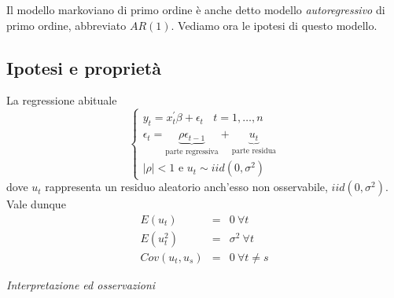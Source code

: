 \documentclass[a4paper]{report}
\newcounter{ese}
\theoremstyle{remark}
\begin{document}
Il modello markoviano di primo ordine \`{e} anche detto modello \emph{%
autoregressivo} di primo ordine, abbreviato $AR(1)$. Vediamo ora le ipotesi
di questo modello.

\subsection{Ipotesi e propriet\`{a}}

La regressione abituale 
\begin{equation*}
\left\{ 
\begin{array}{c}
y_{t}=x_{t}^{\prime }\beta +\epsilon _{t}\ \ \ \ t=1,\dots ,n \\ 
\epsilon _{t}=\underset{\text{parte regressiva}}{\underbrace{\rho \epsilon
_{t-1}}}+\underset{\text{parte residua}}{\underbrace{u_{t}}} \\ 
| \rho | <1\text{ e }u_{t}\sim iid(0,\sigma ^{2})%
\end{array}%
\right.
\end{equation*}%
dove $u_{t}$ rappresenta un residuo aleatorio anch'esso non osservabile, $%
iid(0,\sigma ^{2})$. Vale dunque%
\begin{eqnarray*}
E(u_{t}) &=&0\ \forall t \\
E(u_{t}^{2}) &=&\sigma ^{2}\ \forall t \\
Cov(u_{t},u_{s}) &=&0\ \forall t\neq s
\end{eqnarray*}

\noindent \emph{Interpretazione ed osservazioni}
\end{document}
